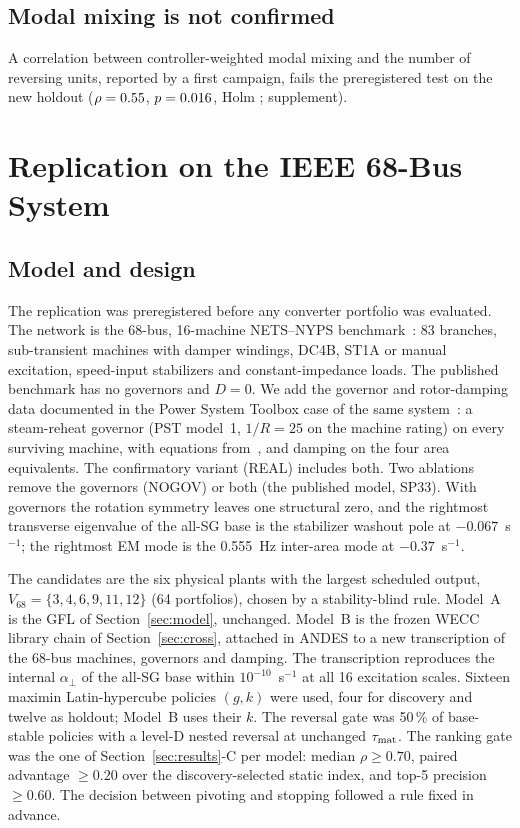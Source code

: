 \documentclass[journal]{IEEEtran}
\theoremstyle{remark}
\newcommand{\aperp}{\alpha_{\perp}}
\begin{document}


\subsection{Modal mixing is not confirmed}
A correlation between controller-weighted modal mixing and the number of
reversing units, reported by a first campaign, fails the preregistered test on
the new holdout ($\rho=0.55$, $p=0.016$, Holm \tThreePholm; supplement).

\section{Replication on the IEEE 68-Bus System}\label{sec:ieee68}

\subsection{Model and design}
The replication was preregistered before any converter portfolio was evaluated.
The network is the 68-bus, 16-machine NETS--NYPS benchmark~\cite{singhpal2013ieee68,canizares2017benchmark}:
83 branches, sub-transient machines with damper windings, DC4B, ST1A or manual
excitation, speed-input stabilizers and constant-impedance loads. The published
benchmark has no governors and $D=0$. We add the governor and rotor-damping data
documented in the Power System Toolbox case of the same system~\cite{chow1992pst}:
a steam-reheat governor (PST model~1, $1/R=25$ on the machine rating) on every
surviving machine, with equations from~\cite{pstess2021}, and damping on the
four area equivalents. The confirmatory variant (REAL) includes both. Two
ablations remove the governors (NOGOV) or both (the published model, SP33). With
governors the rotation symmetry leaves one structural zero, and the rightmost
transverse eigenvalue of the all-SG base is the stabilizer washout pole at
$-0.067$~s$^{-1}$; the rightmost EM mode is the 0.555~Hz inter-area mode at
$-0.37$~s$^{-1}$.

The candidates are the six physical plants with the largest scheduled output,
$V_{68}=\{3,4,6,9,11,12\}$ (64 portfolios), chosen by a stability-blind rule.
Model~A is the GFL of Section~\ref{sec:model}, unchanged. Model~B is the frozen
WECC library chain of Section~\ref{sec:cross}, attached in ANDES to a new
transcription of the 68-bus machines, governors and damping. The transcription
reproduces the internal $\aperp$ of the all-SG base within $10^{-10}$~s$^{-1}$ at
all 16 excitation scales. Sixteen maximin Latin-hypercube policies $(g,k)$ were
used, four for discovery and twelve as holdout; Model~B uses their $k$. The
reversal gate was 50\,\% of base-stable policies with a level-D nested reversal
at unchanged $\tau_{\rm mat}$. The ranking gate was the one of
Section~\ref{sec:results}-C per model: median $\rho\ge0.70$, paired advantage
$\ge0.20$ over the discovery-selected static index, and top-5 precision $\ge0.60$.
The decision between pivoting and stopping followed a rule fixed in advance.
\end{document}
